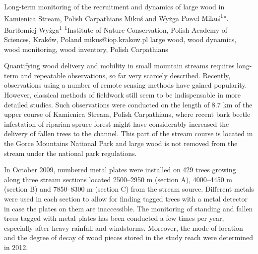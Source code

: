 
\abstract
{Long-term monitoring of the recruitment and dynamics of large wood in Kamienica Stream, Polish Carpathians} %
{Mikuś and Wyżga} %
{Paweł Mikuś\textsuperscript{1}*, Bartłomiej Wyżga\textsuperscript{1}} %
{\TLtag} %
{\textsuperscript{1}Institute of Nature Conservation, Polish Academy of Sciences, Kraków, Poland
} %
{mikus@iop.krakow.pl}  %
{large wood, wood dynamics, wood monitoring, wood inventory, Polish Carpathians}%
{Quantifying wood delivery and mobility in small mountain streams requires long-term and repeatable observations, so far very scarcely described. Recently, observations using a number of remote sensing methods have gained popularity. However, classical methods of fieldwork still seem to be indispensable in more detailed studies. Such observations were conducted on the length of 8.7 km of the upper course of Kamienica Stream, Polish Carpathians, where recent bark beetle infestation of riparian spruce forest might have considerably increased the delivery of fallen trees to the channel. This part of the stream course is located in the Gorce Mountains National Park and large wood is not removed from the stream under the national park regulations.

In October 2009, numbered metal plates were installed on 429 trees growing along three stream sections located 2500–2950 m (section A), 4000–4450 m (section B) and 7850–8300 m (section C) from the stream source. Different metals were used in each section to allow for finding tagged trees with a metal detector in case the plates on them are inaccessible. The monitoring of standing and fallen trees tagged with metal plates has been conducted a few times per year, especially after heavy rainfall and windstorms. Moreover, the mode of location and the degree of decay of wood pieces stored in the study reach were determined in 2012.

}

